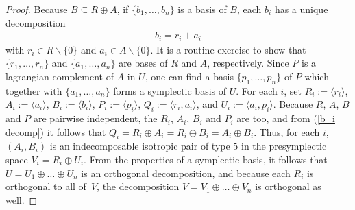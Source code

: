 \documentclass[10pt,a4paper]{amsart}
\numberwithin{equation}{section}
\begin{document}
\begin{proof}
Because $B \subseteq R \oplus A$, if $\{b_1,\dots  ,b_n \}$ is a basis of $B$, each $b_i$ has a unique decomposition
\begin{gather}\label{b_i decomp}
b_i = r_i + a_i
\end{gather}
with  $r_i \in R \backslash \{0\}$ and $a_i \in A \backslash \{0\}$. It is a routine exercise to show that $\{r_1,\dots  ,r_n \}$ and $\{a_1,\dots  ,a_n \}$ are bases of $R$ and $A$, respectively.
Since $P$ is a lagrangian complement of $A$ in $U$, one can f\/ind a basis $\{p_1,\dots  ,p_n \}$ of $P$ which together with $\{a_1,\dots  ,a_n \}$ forms a symplectic basis of $U$.
For each $i$, set $R_i := \langle r_i \rangle$, $A_i := \langle a_i \rangle$, $B_i := \langle b_i \rangle$, $P_i := \langle p_i \rangle$, $Q_i := \langle r_i, a_i \rangle$, and $U_i := \langle a_i,p_i \rangle$.  Because $R$, $A$, $B$ and $P$ are pairwise independent, the $R_i$, $A_i$, $B_i$ and $P_i$ are too, and from (\ref{b_i decomp}) it follows that $Q_i = R_i \oplus A_i = R_i \oplus B_i = A_i \oplus B_i$. Thus, for each $i$, $(A_i,B_i)$ is an indecomposable isotropic pair of type $5$ in the presymplectic space $V_i = R_i \oplus U_i$.   From the properties of a symplectic basis, it follows that $U = U_1 \oplus \dots  \oplus U_n$ is an orthogonal decomposition, and because each $R_i$ is orthogonal to all of~$V$, the decomposition $V = V_1 \oplus \dots  \oplus V_n$ is orthogonal as well.



\end{proof}
\end{document}
